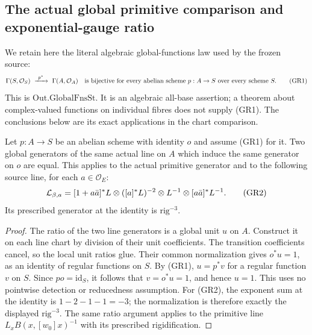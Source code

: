 \subsection{The actual global primitive comparison and exponential-gauge ratio}
\label{subsec:sr-source-exponential-gauge-ratio}

We retain here the literal algebraic global-functions law
used by the frozen source:
\[
 \Gamma(S,\mathcal O_S)\ \xrightarrow{\ p^*\ }\ 
 \Gamma(A,\mathcal O_A)\quad\hbox{is bijective
 for every abelian scheme }p:A\to S
 \hbox{ over every scheme }S.                               \tag{GR1}
\]
This is \(\mathrm{Out.GlobalFnsSt}\).
It is an algebraic all-base assertion; a theorem about
complex-valued functions on individual fibres does not
supply (GR1).  The conclusions below are its exact
applications in the chart comparison.

\begin{srlemma}
\label{lem:sr-source-normalized-global-generators-unique}
Let \(p:A\to S\) be an abelian scheme with identity \(o\)
and assume (GR1) for it.
Two global generators of the same actual line on \(A\)
which induce the same generator on \(o\) are equal.
This applies to the actual primitive generator and to
the following source line, for each \(a\in\mathcal O_E\):
\[
 {\cal L}_{\beta,a}
 =[1+a\bar a]^*L\otimes([a]^*L)^{-2}
                 \otimes L^{-1}\otimes[a\bar a]^*L^{-1}.
                                                               \tag{GR2}
\]
Its prescribed generator at the identity is
\(\mathrm{rig}^{-3}\).
\end{srlemma}
\begin{proof}
The ratio of the two line generators is a global unit
\(u\) on \(A\).
Construct it on each line chart by division of their
unit coefficients.  The transition coefficients cancel,
so the local unit ratios glue.
Their common normalization gives \(o^*u=1\), as an
identity of regular functions on \(S\).
By (GR1), \(u=p^*v\) for a regular function \(v\) on \(S\).
Since \(po=\mathrm{id}_S\), it follows that \(v=o^*u=1\),
and hence \(u=1\).
This uses no pointwise detection or reducedness assumption.
For (GR2), the exponent sum at the identity is
\(1-2-1-1=-3\); the normalization is therefore exactly
the displayed \(\mathrm{rig}^{-3}\).
The same ratio argument applies to the primitive line
\(L_xB(x,[w_0]x)^{-1}\) with its prescribed rigidification.
\end{proof}

